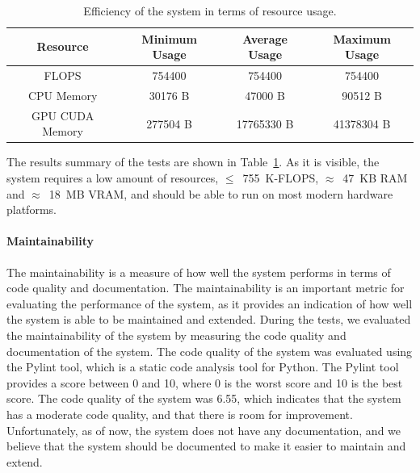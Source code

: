 \begin{table}[!htbp]
    \centering
    \begin{tabular}{|c||c|c|c|}
        \hline
        \textbf{Resource} & \textbf{Minimum Usage} & \textbf{Average Usage} & \textbf{Maximum Usage} \\
        \hline
        \hline
        FLOPS & 754400 & 754400 & 754400\\
        \hline
        CPU Memory & 30176 B & 47000 B & 90512 B \\
        \hline
        GPU CUDA Memory & 277504 B & 17765330 B  & 41378304 B \\
        \hline
    \end{tabular}
    \caption{Efficiency of the system in terms of resource usage.}\label{tab:efficiency}
\end{table}
The results summary of the tests are shown in Table~\ref{tab:efficiency}.
As it is visible, the system requires a low amount of resources, $\le$~755~K-FLOPS, $\approx$~47~KB RAM and $\approx$~18~MB VRAM, and should be able to run on most modern hardware platforms.

\paragraph{Maintainability}
The maintainability is a measure of how well the system performs in terms of code quality and documentation.
The maintainability is an important metric for evaluating the performance of the system, as it provides an indication of how well the system is able to be maintained and extended.
During the tests, we evaluated the maintainability of the system by measuring the code quality and documentation of the system.
The code quality of the system was evaluated using the Pylint tool, which is a static code analysis tool for Python.
The Pylint tool provides a score between 0 and 10, where 0 is the worst score and 10 is the best score.
The code quality of the system was 6.55, which indicates that the system has a moderate code quality, and that there is room for improvement.
Unfortunately, as of now, the system does not have any documentation, and we believe that the system should be documented to make it easier to maintain and extend.


